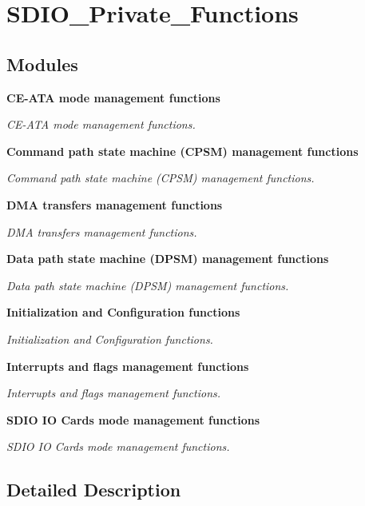 \section{S\+D\+I\+O\+\_\+\+Private\+\_\+\+Functions}
\label{group__SDIO__Private__Functions}
\subsection*{Modules}
\begin{DoxyCompactItemize}
\item 
\textbf{ C\+E-\/\+A\+T\+A mode management functions}
\begin{DoxyCompactList}\small\item\em C\+E-\/\+A\+TA mode management functions. \end{DoxyCompactList}\item 
\textbf{ Command path state machine (\+C\+P\+S\+M) management functions}
\begin{DoxyCompactList}\small\item\em Command path state machine (C\+P\+SM) management functions. \end{DoxyCompactList}\item 
\textbf{ D\+M\+A transfers management functions}
\begin{DoxyCompactList}\small\item\em D\+MA transfers management functions. \end{DoxyCompactList}\item 
\textbf{ Data path state machine (\+D\+P\+S\+M) management functions}
\begin{DoxyCompactList}\small\item\em Data path state machine (D\+P\+SM) management functions. \end{DoxyCompactList}\item 
\textbf{ Initialization and Configuration functions}
\begin{DoxyCompactList}\small\item\em Initialization and Configuration functions. \end{DoxyCompactList}\item 
\textbf{ Interrupts and flags management functions}
\begin{DoxyCompactList}\small\item\em Interrupts and flags management functions. \end{DoxyCompactList}\item 
\textbf{ S\+D\+I\+O I\+O Cards mode management functions}
\begin{DoxyCompactList}\small\item\em S\+D\+IO IO Cards mode management functions. \end{DoxyCompactList}\end{DoxyCompactItemize}


\subsection{Detailed Description}
